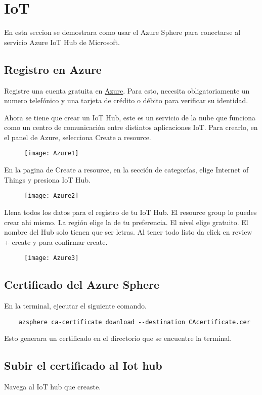 \section{IoT}
En esta seccion se demostrara como usar el Azure Sphere para conectarse al servicio Azure IoT Hub de Microsoft.
\subsection{Registro en Azure}
Registre una cuenta gratuita en \href{https://azure.microsoft.com/es-mx/free}{Azure}. Para esto,	 necesita obligatoriamente un numero telefónico y una tarjeta de crédito o débito para verificar su identidad.

Ahora se tiene que crear un IoT Hub, este es un servicio de la nube que funciona como un centro de comunicación entre distintos aplicaciones IoT. Para crearlo, en el panel de Azure, selecciona Create a resource.
\begin{figure}[h]
	\centering
	\texttt{[image: Azure1]}
\end{figure}
En la pagina de Create a resource, en la sección de categorías, elige Internet of Things y presiona IoT Hub.
\begin{figure}[h]
	\centering
	\texttt{[image: Azure2]}
\end{figure}
Llena todos los datos para el registro de tu IoT Hub. El resource group lo puedes crear ahi mismo. La región elige la de tu preferencia. El nivel elige gratuito. El nombre del Hub solo tienen que ser letras. Al tener todo listo da click en review + create y para confirmar create.
\begin{figure}[h]
	\centering
	\texttt{[image: Azure3]}
\end{figure}
\subsection{Certificado del Azure Sphere}
En la terminal, ejecutar el siguiente comando.
\begin{verbatim}
	azsphere ca-certificate download --destination CAcertificate.cer
\end{verbatim}
Esto generara un certificado en el directorio que se encuentre la terminal.
\subsection{Subir el certificado al Iot hub}
Navega al IoT hub que creaste.


